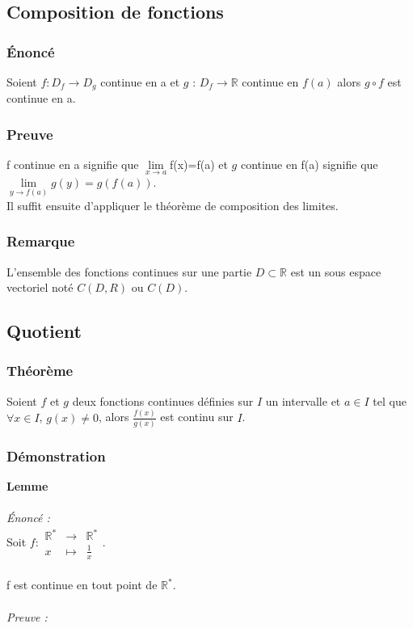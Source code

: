 \documentclass[a4paper,10pt]{book} %
\newcommand{\R}{\mathbb{R}}
\begin{document}
\subsection{Composition de fonctions}
\subsubsection{Énoncé}
Soient $f:D_{f}\rightarrow D_{g}$ continue en a et $g$ : $D_{f}\rightarrow \R$ continue en $f(a)$ alors $g\circ f$ est continue en a.

\subsubsection{Preuve}
f continue en a signifie que $\lim\limits_{x\rightarrow a}$f(x)=f(a) et $g$ continue en f(a) signifie que $\lim\limits_{y\rightarrow f(a)}g(y)=g(f(a))$.\\
Il suffit ensuite d'appliquer le théorème de composition des limites.

\subsubsection{Remarque}
L'ensemble des fonctions continues sur une partie $D\subset \R$ est un sous espace vectoriel noté $C(D,R)$ ou $C(D)$.

\newpage

\subsection{Quotient}
\subsubsection{Théorème}
Soient $f$ et $g$ deux fonctions continues définies sur $I$ un intervalle et $a\in I$ tel que $\forall x\in I$, $g(x)\neq 0$, alors $\frac{f(x)}{g(x)}$ est continu sur $I$.

\subsubsection{Démonstration}
\textbf{Lemme}\\\\
\emph{Énoncé :}\\

Soit $f : \begin{array}{rcl} \R^{*}&\rightarrow& \R^{*} \\
x&\mapsto &\frac{1}{x} \end{array}$.\\\\
f est continue en tout point de $\R^{*}$.\\\\
\emph{Preuve :}\\
\end{document}
